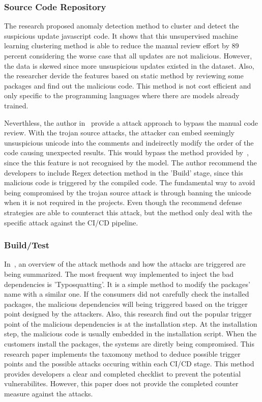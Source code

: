 \subsubsection{Source Code Repository}
The research\cite{garrett2019detecting} proposed anomaly detection method to cluster and detect 
the suspicious update javascript code. It shows that this unsupervised machine learning 
clustering method is able to reduce the manual review effort by 89 percent considering the worse
case that all updates are not malicious. However, the data is skewed since more unsuspicious updates
existed in the dataset. Also, the researcher devide the features based on static method by reviewing
some packages and find out the malicious code. This method is not cost efficient and only specific
to the programming languages where there are models already trained. 

Neverthless, the author in~\cite{boucher2023trojan} provide a attack approach to bypass the manual
code review. With the trojan source attacks, the attacker can embed seemingly unsuspicious unicode into
the comments and indeirectly modify the order of the code causing unexpected results. 
This would bypass the method provided by~\cite{garrett2019detecting}, 
since the this feature is not recognised by the model. The author recommend the developers to include 
Regex detection method in the 'Build' stage, since this malicious code is triggered by the compiled code.
The fundamental way to avoid being compromised by the trojan source attack is through banning the 
unicode when it is not required in the projects. Even though the recommend defense strategies 
are able to counteract this attack, but the method only deal with the specific attack against the 
CI/CD pipeline.

\subsubsection{Build/Test}
In~\cite{ohm2020backstabber}, 
an overview of the attack methods and how the attacks are triggered are being summarized. 
The most frequent way implemented to inject the bad dependencies is 'Typosquatting'. It is a simple method
to modify the packages' name with a similar one. If the consumers did not carefully check the installed 
packages, the malicious dependencies will being triggered based on the trigger point designed by the 
attackers. 
Also, this research find out the popular trigger point of the malicious dependencies is at the
installation step. At the installation step, the malicious code is usually embedded in the installation
script. When the customers install the packages, the systems are diretly being compromised.  
This research paper implements the taxomony method to deduce possible trigger points and 
the possible attacks occuring within each CI/CD stage. This method provides developers a clear 
and completed checklist to prevent the potential vulnerabilites. However, this paper does not
provide the completed counter measure against the attacks.

